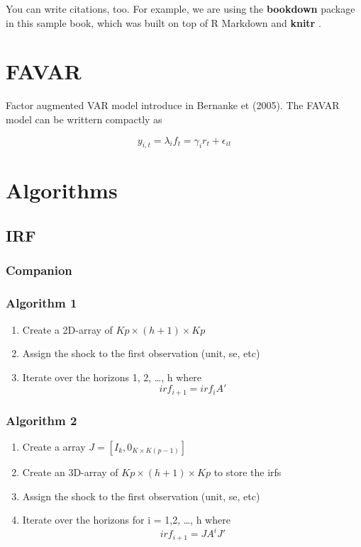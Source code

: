 \documentclass[
]{article}
\providecommand{\tightlist}{%
  \setlength{\itemsep}{0pt}\setlength{\parskip}{0pt}}
\begin{document}
You can write citations, too. For example, we are using the \textbf{bookdown} package \citep{R-bookdown} in this sample book, which was built on top of R Markdown and \textbf{knitr} \citep{xie2015}.

\hypertarget{favar}{%
\section{FAVAR}\label{favar}}

Factor augmented VAR model introduce in Bernanke et (2005). The FAVAR model can be writtern compactly as

\[y_{i,t} = \lambda_i f_t = \gamma_i r_t + \epsilon_{it}\]

\hypertarget{algo}{%
\section{Algorithms}\label{algo}}

\hypertarget{irf}{%
\subsection{IRF}\label{irf}}

\hypertarget{companion}{%
\subsubsection{Companion}\label{companion}}

\hypertarget{irf_algo1}{%
\subsubsection{Algorithm 1}\label{irf_algo1}}

\begin{enumerate}
\def\labelenumi{\arabic{enumi}.}
\tightlist
\item
  Create a 2D-array of \(Kp \times (h+1) \times Kp\)
\item
  Assign the shock to the first observation (unit, se, etc)
\item
  Iterate over the horizons 1, 2, \ldots, h where
  \[ irf_{i+1} = irf_{i} A'\]
\end{enumerate}

\hypertarget{irf_algo2}{%
\subsubsection{Algorithm 2}\label{irf_algo2}}

\begin{enumerate}
\def\labelenumi{\arabic{enumi}.}
\tightlist
\item
  Create a array \(J = [I_k, 0_{K\times K(p-1)}]\)
\item
  Create an 3D-array of \(Kp \times (h + 1) \times Kp\) to store the irfs
\item
  Assign the shock to the first observation (unit, se, etc)
\item
  Iterate over the horizons for i = 1,2, \ldots, h where
  \[ irf_{i+1} = J A^i J'\]
\end{enumerate}
\end{document}
